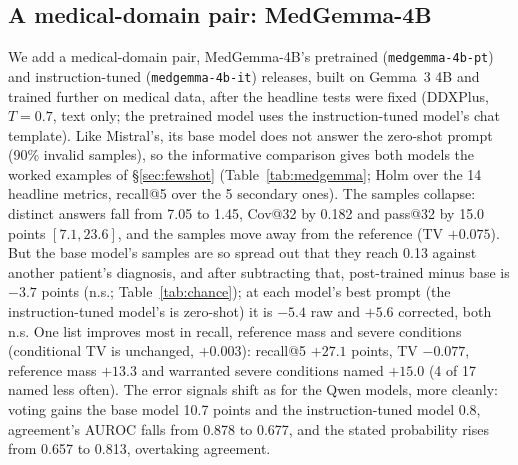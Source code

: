 \documentclass[wcp]{jmlr}
\begin{document}
\subsection{A medical-domain pair: MedGemma-4B}\label{sec:medgemma}
We add a medical-domain pair, MedGemma-4B's pretrained (\texttt{medgemma-4b-pt}) and instruction-tuned (\texttt{medgemma-4b-it}) releases, built on Gemma~3 4B and trained further on medical data, after the headline tests were fixed (DDXPlus, $T{=}0.7$, text only; the pretrained model uses the instruction-tuned model's chat template). Like Mistral's, its base model does not answer the zero-shot prompt (90\% invalid samples), so the informative comparison gives both models the worked examples of \S\ref{sec:fewshot} (Table~\ref{tab:medgemma}; Holm over the 14 headline metrics, recall@5 over the 5 secondary ones). The samples collapse: distinct answers fall from 7.05 to 1.45, Cov@32 by 0.182 and pass@32 by 15.0 points $[7.1,23.6]$, and the samples move away from the reference (TV $+0.075$). But the base model's samples are so spread out that they reach 0.13 against another patient's diagnosis, and after subtracting that, post-trained minus base is $-3.7$ points (n.s.; Table~\ref{tab:chance}); at each model's best prompt (the instruction-tuned model's is zero-shot) it is $-5.4$ raw and $+5.6$ corrected, both n.s. One list improves most in recall, reference mass and severe conditions (conditional TV is unchanged, $+0.003$): recall@5 $+27.1$ points, TV $-0.077$, reference mass $+13.3$ and warranted severe conditions named $+15.0$ (4 of 17 named less often). The error signals shift as for the Qwen models, more cleanly: voting gains the base model 10.7 points and the instruction-tuned model 0.8, agreement's AUROC falls from 0.878 to 0.677, and the stated probability rises from 0.657 to 0.813, overtaking agreement.
\end{document}
